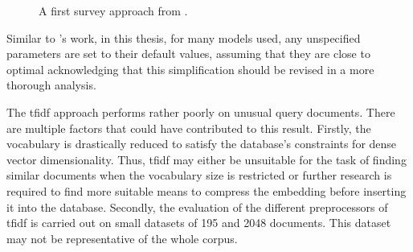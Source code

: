 \begin{figure}%
    \centering
    \qquad
    \caption[Survey approach]{A first survey approach from \cite{BA-survey}.}%
    \label{fig:survey}%
\end{figure}

Similar to \citeauthor{glove2014}'s work, in this thesis, for many models used, any unspecified parameters are set to their default values, 
assuming that they are close to optimal
acknowledging that this simplification should be revised in a more thorough analysis.

The \ac{tfidf} approach performs rather poorly on unusual query documents.
There are multiple factors that could have contributed to this result.
Firstly, the vocabulary is drastically reduced to satisfy the database's constraints for dense vector dimensionality.
Thus, \ac{tfidf} may either be unsuitable for the task of finding similar documents when the vocabulary size is restricted or 
further research is required to find more suitable means to compress the embedding before inserting it into the database.
Secondly, the evaluation of the different preprocessors of \ac{tfidf} is carried out on small datasets of 195 and 2048 documents.
This dataset may not be representative of the whole corpus.

